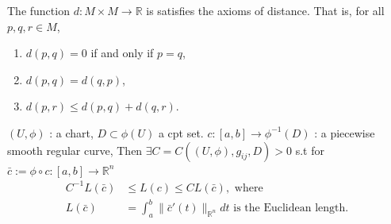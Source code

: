 \begin{theorem}\label{thm:4.9}
The function $d:M\times M \to \mathbb{R}$ is satisfies the axioms of distance. That is, for all $p,q,r \in M$,
\begin{enumerate}[label=(\arabic*), ref=Theorem \thetheorem~(\arabic*)]
\item $d(p,q) = 0$ if and only if $p=q$,
\item $d(p,q) = d(q,p)$,
\item $d(p,r) \leq d(p,q) + d(q,r)$.
\end{enumerate}
\end{theorem}

\begin{lemma}
$\left(U, \phi \right)$ : a chart, $D \subset \phi(U)$ a cpt set.
$c : [a,b] \rightarrow \phi^{-1} (D)$ : a piecewise smooth regular curve, Then $\exists C = C\left( (U, \phi), g_{ij}, D \right) >0$ s.t 
for $\bar{c} := \phi \circ c :[a,b] \rightarrow \mathbb{R}^n$
\[
\begin{aligned}
    C^{-1} L(\bar{c}) &\leq L(c) \leq C L(\bar{c}), \text{ where}\\
    L(\bar{c}) &= \int_a^b \|\bar{c}'(t)\|_{\mathbb{R}^n} dt \text{ is the Euclidean length.}
\end{aligned}
\]
\label{lemma:4.10}
\end{lemma}

